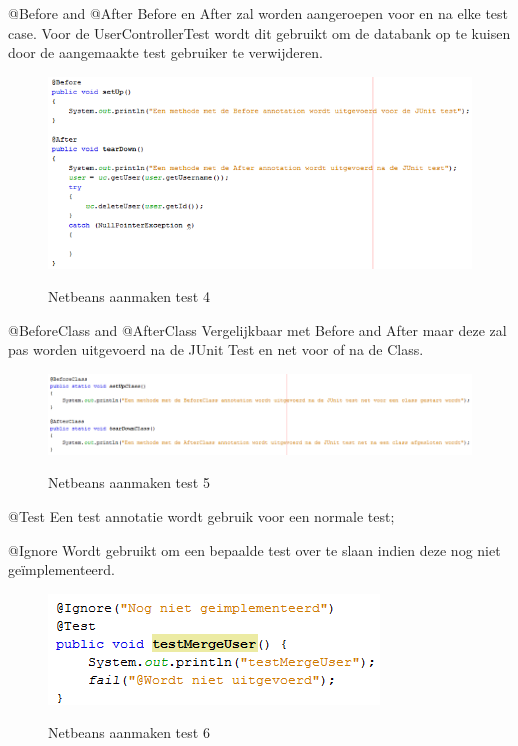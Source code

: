 \documentclass[pdftex,a4paper,12pt,twoside]{report}
\begin{document}
@Before and @After
Before en After zal worden aangeroepen voor en na elke test case.
Voor de UserControllerTest wordt dit gebruikt om de databank op te kuisen door de aangemaakte test gebruiker te verwijderen.

\begin{figure}[!htb]
\includegraphics{images/beforeafter.png}\\
\caption{Netbeans aanmaken test 4}
\end{figure}


@BeforeClass and @AfterClass
Vergelijkbaar met Before and After maar deze zal pas worden uitgevoerd na de JUnit Test en net voor of na de Class.

\begin{figure}[!htb]
\includegraphics{images/beforeafterclass.png}\\
\caption{Netbeans aanmaken test 5}
\end{figure}

@Test
Een test annotatie wordt gebruik voor een normale test;

@Ignore
Wordt gebruikt om een bepaalde test over te slaan indien deze nog niet geïmplementeerd.

\begin{figure}[!htb]
\includegraphics{images/junit2.png}\\
\caption{Netbeans aanmaken test 6}
\end{figure}
\end{document}
